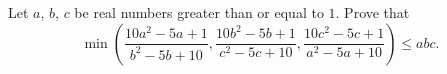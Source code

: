 Let $a$, $b$, $c$ be real numbers greater than or equal to $1$. Prove that
\[ \min \left(\frac{10a^2-5a+1}{b^2-5b+10},\frac{10b^2-5b+1}{c^2-5c+10},\frac{10c^2-5c+1}{a^2-5a+10}\right )\leq abc. \]